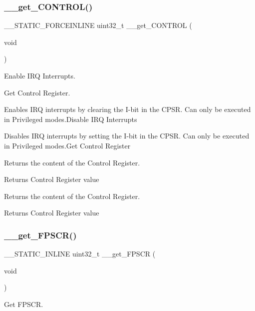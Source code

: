 \subsubsection{\texorpdfstring{\_\_get\_CONTROL()}{\_\_get\_CONTROL()}}
{\footnotesize\ttfamily \+\_\+\+\_\+\+S\+T\+A\+T\+I\+C\+\_\+\+F\+O\+R\+C\+E\+I\+N\+L\+I\+NE uint32\+\_\+t \+\_\+\+\_\+get\+\_\+\+C\+O\+N\+T\+R\+OL (\begin{DoxyParamCaption}\item[{void}]{ }\end{DoxyParamCaption})}



Enable I\+RQ Interrupts. 

Get Control Register.

Enables I\+RQ interrupts by clearing the I-\/bit in the C\+P\+SR. Can only be executed in Privileged modes.\+Disable I\+RQ Interrupts

Disables I\+RQ interrupts by setting the I-\/bit in the C\+P\+SR. Can only be executed in Privileged modes.\+Get Control Register

Returns the content of the Control Register. \begin{DoxyReturn}{Returns}
Control Register value
\end{DoxyReturn}
Returns the content of the Control Register. \begin{DoxyReturn}{Returns}
Control Register value 
\end{DoxyReturn}
\mbox{\label{group___c_m_s_i_s___core___reg_acc_functions_ga6a275172e274ea7ce6c22030d07c6c64}} 
\subsubsection{\texorpdfstring{\_\_get\_FPSCR()}{\_\_get\_FPSCR()}}
{\footnotesize\ttfamily \+\_\+\+\_\+\+S\+T\+A\+T\+I\+C\+\_\+\+I\+N\+L\+I\+NE uint32\+\_\+t \+\_\+\+\_\+get\+\_\+\+F\+P\+S\+CR (\begin{DoxyParamCaption}\item[{void}]{ }\end{DoxyParamCaption})}



Get F\+P\+S\+CR. 

